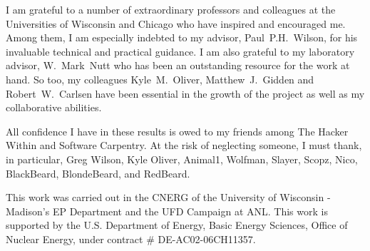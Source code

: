 I am grateful to a number of extraordinary professors and colleagues at the 
Universities of Wisconsin and Chicago who have inspired and encouraged me. 
Among  them, I am especially indebted to my advisor, Paul~P.H.~Wilson, for his 
invaluable technical and practical guidance. I am also grateful to my 
laboratory advisor, W.~Mark~Nutt who has been an outstanding resource for the 
work at hand. So too, my colleagues Kyle~M.~Oliver, Matthew~J.~Gidden and 
Robert~W.~Carlsen have been essential in the growth of the \Cyclus project as 
well as my collaborative abilities.

All confidence I have in these results is owed to my friends among The Hacker 
Within and Software Carpentry. At the risk of neglecting someone, I must thank, 
in particular, Greg Wilson, Kyle Oliver, Animal1, Wolfman, Slayer, Scopz, Nico,  
BlackBeard, BlondeBeard, and RedBeard.

This work was carried out in the \gls{CNERG} of the University of Wisconsin - 
Madison's \gls{EP} Department and the \gls{UFD} Campaign at \gls{ANL}. This 
work is supported by the U.S. Department of Energy, Basic Energy Sciences, 
Office of Nuclear Energy, under contract \# DE-AC02-06CH11357.
